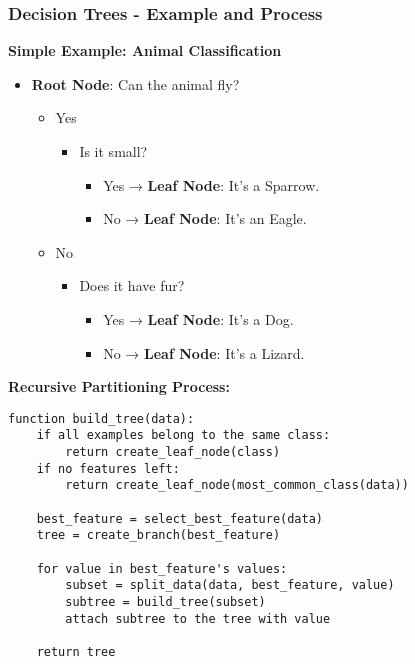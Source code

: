 \documentclass[aspectratio=169]{beamer}
\begin{document}
\begin{frame}[fragile]
    \frametitle{Decision Trees - Example and Process}
    \textbf{Simple Example: Animal Classification}
    \begin{itemize}
        \item \textbf{Root Node}: Can the animal fly?
            \begin{itemize}
                \item Yes
                    \begin{itemize}
                        \item Is it small?
                            \begin{itemize}
                                \item Yes → \textbf{Leaf Node}: It’s a Sparrow.
                                \item No → \textbf{Leaf Node}: It’s an Eagle.
                            \end{itemize}
                    \end{itemize}
                \item No
                    \begin{itemize}
                        \item Does it have fur?
                            \begin{itemize}
                                \item Yes → \textbf{Leaf Node}: It’s a Dog.
                                \item No → \textbf{Leaf Node}: It’s a Lizard.
                            \end{itemize}
                    \end{itemize}
            \end{itemize}
    \end{itemize}
    
    \textbf{Recursive Partitioning Process:}
    \begin{lstlisting}
function build_tree(data):
    if all examples belong to the same class:
        return create_leaf_node(class)
    if no features left:
        return create_leaf_node(most_common_class(data))
    
    best_feature = select_best_feature(data)
    tree = create_branch(best_feature)

    for value in best_feature's values:
        subset = split_data(data, best_feature, value)
        subtree = build_tree(subset)
        attach subtree to the tree with value
    
    return tree
    \end{lstlisting}
\end{frame}
\end{document}
